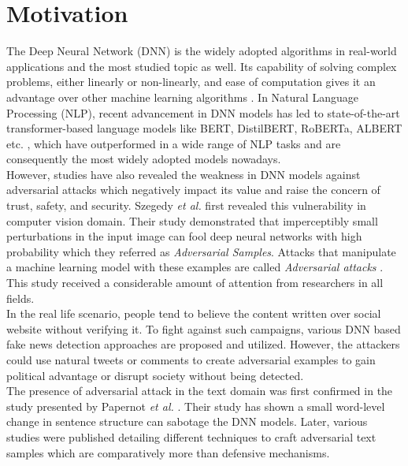 \documentclass[%
	BCOR=8mm, %
	DIV=12,
	toc=bibliography, %
	toc=listof, %
	oneside, %
	egregdoesnotlikesansseriftitles, %
	]{scrbook}
\begin{document}
\section{Motivation}
The Deep Neural Network (DNN) is the widely  adopted algorithms in real-world applications and the most studied topic as well. Its capability of solving complex problems, either linearly or non-linearly, and ease of computation gives it an advantage over other machine learning algorithms \cite{huq_adversarial_2020-1}. In Natural Language Processing (NLP), recent advancement in DNN models  has led to state-of-the-art transformer-based language models like BERT,  DistilBERT, RoBERTa, ALBERT etc. \cite{devlin_bert_2019-1,liu_roberta_2019-1,sanh_distilbert_2020,lan_albert_2020}, which have outperformed in a wide range of NLP tasks  and are consequently the most widely adopted models nowadays.\\
However, studies have also revealed the weakness in DNN models against adversarial attacks \cite{szegedy_intriguing_2014,yuan_adversarial_2018,akhtar_threat_2018,huq_adversarial_2020-1,zhang_adversarial_2019} which  negatively impact its value and raise the concern of trust, safety, and security. Szegedy \textit{et al.} \cite{szegedy_intriguing_2014} first revealed this vulnerability in computer vision domain. Their study demonstrated that imperceptibly small perturbations in the input image can fool deep neural networks with high probability which they referred  as \textit{Adversarial Samples}. Attacks that manipulate a machine learning model with these examples are called \textit{Adversarial attacks} \cite{nicolae_adversarial_2019}.  This study received a considerable amount of attention from researchers in all fields. \\
In the real life scenario, people tend to believe the content written over social website without verifying it. To fight against such campaigns, various DNN based fake news detection approaches are proposed and utilized.  However, the attackers could use natural tweets or comments to create adversarial examples to gain political advantage or disrupt society without being detected. \\
The presence of adversarial attack in the text domain was first confirmed in the study presented by Papernot \textit{et al.} \cite{papernot_crafting_2016}. Their  study has shown  a small word-level change in sentence structure can sabotage the DNN models. Later, various studies were published detailing different techniques to craft adversarial text samples which are comparatively more than defensive mechanisms. \\
\end{document}
